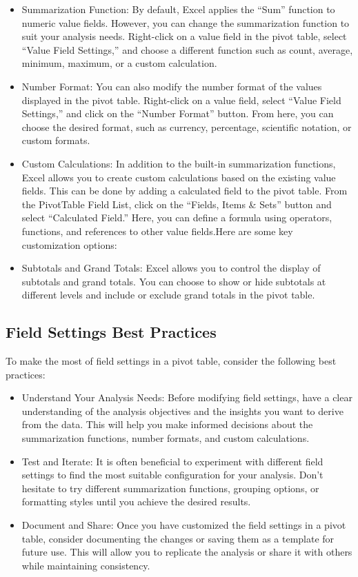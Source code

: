 \documentclass[
]{book}
\begin{document}
\begin{itemize}
\item
  Summarization Function: By default, Excel applies the ``Sum'' function to numeric value fields. However, you can change the summarization function to suit your analysis needs. Right-click on a value field in the pivot table, select ``Value Field Settings,'' and choose a different function such as count, average, minimum, maximum, or a custom calculation.
\item
  Number Format: You can also modify the number format of the values displayed in the pivot table. Right-click on a value field, select ``Value Field Settings,'' and click on the ``Number Format'' button. From here, you can choose the desired format, such as currency, percentage, scientific notation, or custom formats.
\item
  Custom Calculations: In addition to the built-in summarization functions, Excel allows you to create custom calculations based on the existing value fields. This can be done by adding a calculated field to the pivot table. From the PivotTable Field List, click on the ``Fields, Items \& Sets'' button and select ``Calculated Field.'' Here, you can define a formula using operators, functions, and references to other value fields.Here are some key customization options:
\item
  Subtotals and Grand Totals: Excel allows you to control the display of subtotals and grand totals. You can choose to show or hide subtotals at different levels and include or exclude grand totals in the pivot table.
\end{itemize}

\hypertarget{field-settings-best-practices}{%
\subsection{Field Settings Best Practices}\label{field-settings-best-practices}}

To make the most of field settings in a pivot table, consider the following best practices:

\begin{itemize}
\item
  Understand Your Analysis Needs: Before modifying field settings, have a clear understanding of the analysis objectives and the insights you want to derive from the data. This will help you make informed decisions about the summarization functions, number formats, and custom calculations.
\item
  Test and Iterate: It is often beneficial to experiment with different field settings to find the most suitable configuration for your analysis. Don't hesitate to try different summarization functions, grouping options, or formatting styles until you achieve the desired results.
\item
  Document and Share: Once you have customized the field settings in a pivot table, consider documenting the changes or saving them as a template for future use. This will allow you to replicate the analysis or share it with others while maintaining consistency.
\end{itemize}
\end{document}
